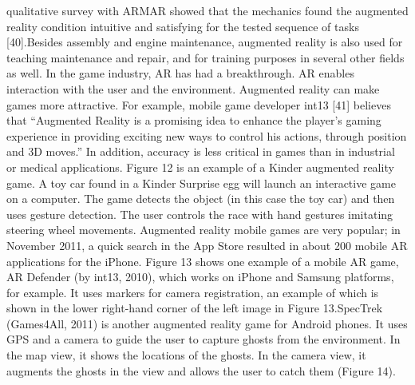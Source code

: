qualitative survey with ARMAR showed that the mechanics found the augmented
reality condition intuitive and satisfying for the tested sequence of tasks [40].Besides assembly and engine maintenance, augmented reality is also used for
teaching maintenance and repair, and for training purposes in several other fields
as well.
In the game industry, AR has had a breakthrough. AR enables interaction with
the user and the environment. Augmented reality can make games more attractive.
For example, mobile game developer int13 [41] believes that “Augmented
Reality is a promising idea to enhance the player's gaming experience in providing
exciting new ways to control his actions, through position and 3D moves.”
In addition, accuracy is less critical in games than in industrial or medical applications.
Figure 12 is an example of a Kinder augmented reality game. A toy car
found in a Kinder Surprise egg will launch an interactive game on a computer. The
game detects the object (in this case the toy car) and then uses gesture detection.
The user controls the race with hand gestures imitating steering wheel movements.
Augmented reality mobile games are very popular; in November 2011, a quick
search in the App Store resulted in about 200 mobile AR applications for the iPhone.
Figure 13 shows one example of a mobile AR game, AR Defender (by int13,
2010), which works on iPhone and Samsung platforms, for example. It uses markers
for camera registration, an example of which is shown in the lower right-hand
corner of the left image in Figure 13.SpecTrek (Games4All, 2011) is another augmented reality game for Android
phones. It uses GPS and a camera to guide the user to capture ghosts from the
environment. In the map view, it shows the locations of the ghosts. In the camera view,
it augments the ghosts in the view and allows the user to catch them (Figure 14).

